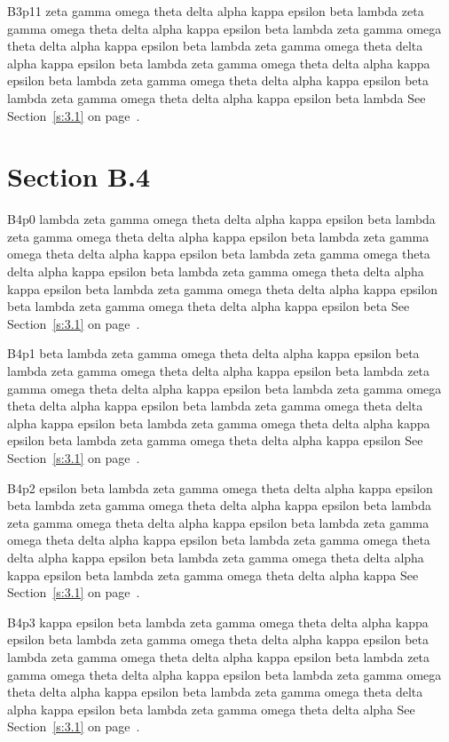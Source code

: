 B3p11 zeta gamma omega theta delta alpha kappa epsilon beta lambda zeta gamma omega theta delta alpha kappa epsilon beta lambda zeta gamma omega theta delta alpha kappa epsilon beta lambda zeta gamma omega theta delta alpha kappa epsilon beta lambda zeta gamma omega theta delta alpha kappa epsilon beta lambda zeta gamma omega theta delta alpha kappa epsilon beta lambda zeta gamma omega theta delta alpha kappa epsilon beta lambda See Section~\ref{s:3.1} on page~\pageref{s:3.1}.

\section{Section B.4}\label{s:B.4}
B4p0 lambda zeta gamma omega theta delta alpha kappa epsilon beta lambda zeta gamma omega theta delta alpha kappa epsilon beta lambda zeta gamma omega theta delta alpha kappa epsilon beta lambda zeta gamma omega theta delta alpha kappa epsilon beta lambda zeta gamma omega theta delta alpha kappa epsilon beta lambda zeta gamma omega theta delta alpha kappa epsilon beta lambda zeta gamma omega theta delta alpha kappa epsilon beta See Section~\ref{s:3.1} on page~\pageref{s:3.1}.

B4p1 beta lambda zeta gamma omega theta delta alpha kappa epsilon beta lambda zeta gamma omega theta delta alpha kappa epsilon beta lambda zeta gamma omega theta delta alpha kappa epsilon beta lambda zeta gamma omega theta delta alpha kappa epsilon beta lambda zeta gamma omega theta delta alpha kappa epsilon beta lambda zeta gamma omega theta delta alpha kappa epsilon beta lambda zeta gamma omega theta delta alpha kappa epsilon See Section~\ref{s:3.1} on page~\pageref{s:3.1}.

B4p2 epsilon beta lambda zeta gamma omega theta delta alpha kappa epsilon beta lambda zeta gamma omega theta delta alpha kappa epsilon beta lambda zeta gamma omega theta delta alpha kappa epsilon beta lambda zeta gamma omega theta delta alpha kappa epsilon beta lambda zeta gamma omega theta delta alpha kappa epsilon beta lambda zeta gamma omega theta delta alpha kappa epsilon beta lambda zeta gamma omega theta delta alpha kappa See Section~\ref{s:3.1} on page~\pageref{s:3.1}.

B4p3 kappa epsilon beta lambda zeta gamma omega theta delta alpha kappa epsilon beta lambda zeta gamma omega theta delta alpha kappa epsilon beta lambda zeta gamma omega theta delta alpha kappa epsilon beta lambda zeta gamma omega theta delta alpha kappa epsilon beta lambda zeta gamma omega theta delta alpha kappa epsilon beta lambda zeta gamma omega theta delta alpha kappa epsilon beta lambda zeta gamma omega theta delta alpha See Section~\ref{s:3.1} on page~\pageref{s:3.1}.

